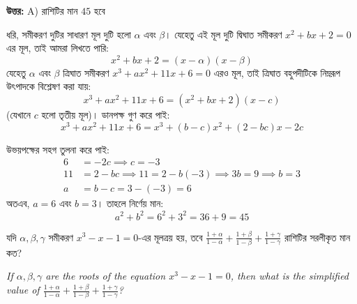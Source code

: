 \documentclass[12pt, a4paper]{article}
\begin{document}
\vspace{0.5em}
\begin{tcolorbox}[answerbox]
    \textbf{\color{success} উত্তর:} A) রাশিটির মান $45$ হবে
\end{tcolorbox}
\vspace{1em}

\begin{tcolorbox}[solutionbox={সমাধান (Solution)}]
    \noindent
    ধরি, সমীকরণ দুটির সাধারণ মূল দুটি হলো $\alpha$ এবং $\beta$। যেহেতু এই মূল দুটি দ্বিঘাত সমীকরণ $x^2 + bx + 2 = 0$ এর মূল, তাই আমরা লিখতে পারি:
    \[ x^2 + bx + 2 = (x-\alpha)(x-\beta) \]
    যেহেতু $\alpha$ এবং $\beta$ ত্রিঘাত সমীকরণ $x^3 + ax^2 + 11x + 6 = 0$ এরও মূল, তাই ত্রিঘাত বহুপদীটিকে নিম্নরূপ উৎপাদকে বিশ্লেষণ করা যায়:
    \[ x^3 + ax^2 + 11x + 6 = (x^2 + bx + 2)(x-c) \] 
    (যেখানে $c$ হলো তৃতীয় মূল)। ডানপক্ষ গুণ করে পাই:
    \[ x^3 + ax^2 + 11x + 6 = x^3 + (b-c)x^2 + (2-bc)x - 2c \]
    
    \vspace{0.5em}
    উভয়পক্ষের সহগ তুলনা করে পাই:
    \begin{align*}
        6 &= -2c \implies c = -3 \\
        11 &= 2 - bc \implies 11 = 2 - b(-3) \implies 3b = 9 \implies b = 3 \\
        a &= b - c = 3 - (-3) = 6
    \end{align*}
    অতএব, $a = 6$ এবং $b = 3$। তাহলে নির্ণেয় মান:
    \[ a^2 + b^2 = 6^2 + 3^2 = 36 + 9 = 45 \]
\end{tcolorbox}
\vspace{1em}

\begin{tcolorbox}[questionbox={প্রশ্ন (Question) 36}]
    \noindent
    যদি $\alpha, \beta, \gamma$ সমীকরণ $x^3 - x - 1 = 0$-এর মূলত্রয় হয়, তবে $\frac{1+\alpha}{1-\alpha} + \frac{1+\beta}{1-\beta} + \frac{1+\gamma}{1-\gamma}$ রাশিটির সরলীকৃত মান কত?
    
    \vspace{0.8em}
    \begin{english}
    \noindent\textit{\color{darkgray}
    If $\alpha, \beta, \gamma$ are the roots of the equation $x^3 - x - 1 = 0$, then what is the simplified value of $\frac{1+\alpha}{1-\alpha} + \frac{1+\beta}{1-\beta} + \frac{1+\gamma}{1-\gamma}$?
    }
    \end{english}
\end{tcolorbox}
\end{document}
